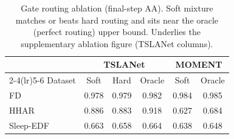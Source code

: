 \begin{table}[t]
\centering
\caption{Gate routing ablation (final-step AA). Soft mixture matches or beats
hard routing and sits near the oracle (perfect routing) upper bound.
Underlies the supplementary ablation figure (TSLANet columns).}
\label{tab:gate}
\small
\begin{tabular}{l ccc cc}
\toprule
& \multicolumn{3}{c}{TSLANet} & \multicolumn{2}{c}{MOMENT}\\
\cmidrule(lr){2-4}\cmidrule(lr){5-6}
Dataset & Soft & Hard & Oracle & Soft & Oracle\\
\midrule
FD & 0.978 & 0.979 & 0.982 & 0.984 & 0.985\\
HHAR & 0.886 & 0.883 & 0.918 & 0.627 & 0.684\\
Sleep-EDF & 0.663 & 0.658 & 0.664 & 0.638 & 0.648\\
\bottomrule
\end{tabular}
\end{table}

